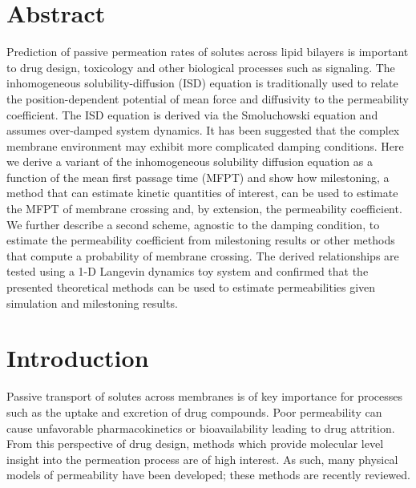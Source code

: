 
\section{Abstract}
\par Prediction of passive permeation rates of solutes across lipid bilayers is important to drug design, toxicology and other biological processes such as signaling. The inhomogeneous solubility-diffusion (ISD) equation is traditionally used to relate the position-dependent potential of mean force and diffusivity to the permeability coefficient. The ISD equation is derived via the Smoluchowski equation and assumes over-damped system dynamics. It has been suggested that the complex membrane environment may exhibit more complicated damping conditions. Here we derive a variant of the inhomogeneous solubility diffusion equation as a function of the mean first passage time (MFPT) and show how milestoning, a method that can estimate kinetic quantities of interest, can be used to estimate the MFPT of membrane crossing and, by extension, the permeability coefficient. We further describe a second scheme, agnostic to the damping condition, to estimate the permeability coefficient from milestoning results or other methods that compute a probability of membrane crossing. The derived relationships are tested using a 1-D Langevin dynamics toy system and confirmed that the presented theoretical methods can be used to estimate permeabilities given simulation and milestoning results.

\section{Introduction}
    \par Passive transport of solutes across membranes is of key importance for processes such as the uptake and excretion of drug compounds. Poor permeability can cause unfavorable pharmacokinetics or bioavailability leading to drug attrition\cite{Kola2004}. From this perspective of drug design, methods which provide molecular level insight into the permeation process are of high interest. As such, many physical models of permeability have been developed; these methods are recently reviewed\cite{Swift2013}.

